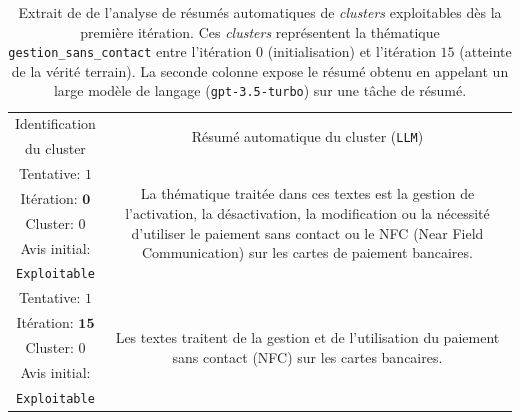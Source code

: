 			\begin{table}[!htb]
				\begin{center}
				\def\arraystretch{0.8}  %
				\begin{tabular}{|c|c|}
				
				\hline
				Identification
					& \multirow{2}{*}{
						Résumé automatique du cluster (\texttt{LLM})
					}
					\tabularnewline
				du cluster
					&
					\tabularnewline
					\hline
				
				{ \footnotesize Tentative: $1$ }
					& \multirow{5}{*}{\parbox{12cm}{
						\footnotesize La thématique traitée dans ces textes est la gestion de l'activation, la désactivation, la modification ou la nécessité d'utiliser le paiement sans contact ou le NFC (Near Field Communication) sur les cartes de paiement bancaires.
					}}
					\tabularnewline
				{ \footnotesize Itération: $\textbf{0}$ }
					&
					\tabularnewline
				{ \footnotesize Cluster: $0$ }
					&
					\tabularnewline
				{ \footnotesize Avis initial: }
					&
					\tabularnewline
				{ \footnotesize \color{colorDarkPastelGreen} \texttt{Exploitable} }
					&
					\tabularnewline
					\hline
					
				{ \footnotesize Tentative: $1$ }
					& \multirow{5}{*}{\parbox{12cm}{
						\footnotesize Les textes traitent de la gestion et de l'utilisation du paiement sans contact (NFC) sur les cartes bancaires.
					}}
					\tabularnewline
				{ \footnotesize Itération: $\textbf{15}$ }
					&
					\tabularnewline
				{ \footnotesize Cluster: $0$ }
					& 
					\tabularnewline
				{ \footnotesize Avis initial: }
					&
					\tabularnewline
				{ \footnotesize \color{colorDarkPastelGreen} \texttt{Exploitable} }
					&
					\tabularnewline
					\hline
					
				\end{tabular}
				\end{center}
				\caption{
					Extrait de de l'analyse de résumés automatiques de \textit{clusters} exploitables dès la première itération.
					Ces \textit{clusters} représentent la thématique \texttt{gestion\_sans\_contact} entre l'itération $0$ (initialisation) et l'itération $15$ (atteinte de la vérité terrain).
					La seconde colonne expose le résumé obtenu en appelant un large modèle de langage (\texttt{gpt-3.5-turbo}) sur une tâche de résumé.
				}
				\label{table:4.4.3-ETUDE-PERTINENCE-RESUME-AUTOMATIQUE-GESTION-SANS-CONTACT}
			\end{table}
			
